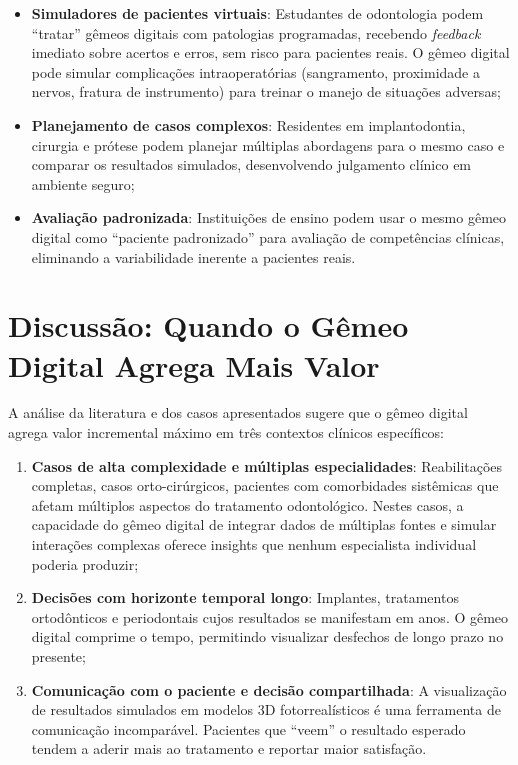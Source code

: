 \begin{itemize}
    \item \textbf{Simuladores de pacientes virtuais}: Estudantes de odontologia podem ``tratar'' gêmeos digitais com patologias programadas, recebendo \textit{feedback} imediato sobre acertos e erros, sem risco para pacientes reais. O gêmeo digital pode simular complicações intraoperatórias (sangramento, proximidade a nervos, fratura de instrumento) para treinar o manejo de situações adversas;

    \item \textbf{Planejamento de casos complexos}: Residentes em implantodontia, cirurgia e prótese podem planejar múltiplas abordagens para o mesmo caso e comparar os resultados simulados, desenvolvendo julgamento clínico em ambiente seguro;

    \item \textbf{Avaliação padronizada}: Instituições de ensino podem usar o mesmo gêmeo digital como ``paciente padronizado'' para avaliação de competências clínicas, eliminando a variabilidade inerente a pacientes reais.
\end{itemize}

\section{Discussão: Quando o Gêmeo Digital Agrega Mais Valor}

A análise da literatura e dos casos apresentados sugere que o gêmeo digital agrega valor incremental máximo em três contextos clínicos específicos:

\begin{enumerate}
    \item \textbf{Casos de alta complexidade e múltiplas especialidades}: Reabilitações completas, casos orto-cirúrgicos, pacientes com comorbidades sistêmicas que afetam múltiplos aspectos do tratamento odontológico. Nestes casos, a capacidade do gêmeo digital de integrar dados de múltiplas fontes e simular interações complexas oferece insights que nenhum especialista individual poderia produzir;

    \item \textbf{Decisões com horizonte temporal longo}: Implantes, tratamentos ortodônticos e periodontais cujos resultados se manifestam em anos. O gêmeo digital comprime o tempo, permitindo visualizar desfechos de longo prazo no presente;

    \item \textbf{Comunicação com o paciente e decisão compartilhada}: A visualização de resultados simulados em modelos 3D fotorrealísticos é uma ferramenta de comunicação incomparável. Pacientes que ``veem'' o resultado esperado tendem a aderir mais ao tratamento e reportar maior satisfação.
\end{enumerate}

